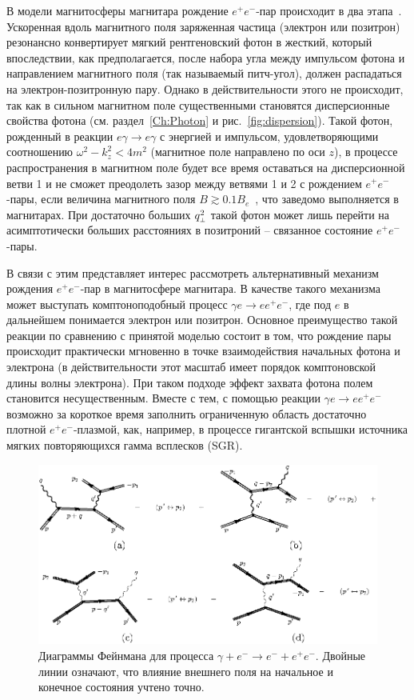 В модели магнитосферы магнитара рождение $e^+e^-$-пар происходит в два 
этапа~\cite{Beloborodov:2007}. Ускоренная вдоль магнитного поля 
заряженная частица (электрон или позитрон)  
резонансно конвертирует мягкий рентгеновский 
фотон в жесткий, который впоследствии, как предполагается, 
после набора угла между импульсом фотона и направлением 
магнитного поля (так называемый питч-угол), 
должен распадаться на электрон-позитронную пару.  Однако в действительности этого не происходит, так как 
в сильном магнитном поле существенными становятся 
дисперсионные свойства фотона (см. раздел~\ref{Ch:Photon}  и 
рис.~\ref{fig:dispersion}). Такой фотон, рожденный 
в реакции $e\gamma \to e \gamma$ с энергией и импульсом, удовлетворяющими соотношению 
$\omega^2-k_z^2 < 4m^2$ (магнитное поле направлено по оси $z$), в процессе 
распространения 
в магнитном поле будет все время оставаться на дисперсионной ветви 1 и не сможет преодолеть 
зазор между ветвями 1 и 2 с рождением $e^+e^-$-пары, если 
величина магнитного поля $B \gtrsim 0.1 B_e$~\cite{Shabad:1975,ShabUsov:1982,ShabUsov:1985}, 
что заведомо выполняется в магнитарах. 
При достаточно больших $q^2_{\mbox{\tiny $\bot$}}$ 
такой фотон может лишь перейти на асимптотически больших расстояниях 
в позитроний -- связанное состояние $e^+e^-$-пары. 



В связи с этим представляет интерес рассмотреть альтернативный механизм  рождения 
$e^+e^-$-пар в магнитосфере магнитара. В качестве такого механизма может выступать 
комптоноподобный процесс $\gamma e \to e e^+e^-$, где 
под $e$ в дальнейшем понимается электрон или позитрон. 
Основное преимущество такой реакции по сравнению с принятой 
моделью состоит в том, что рождение пары происходит практически мгновенно в точке взаимодействия 
начальных фотона и электрона 
(в действительности этот масштаб имеет порядок комптоновской длины волны электрона). При таком 
подходе эффект захвата фотона полем становится несущественным. 
Вместе с тем, с помощью 
реакции $\gamma e \to e e^+e^-$ возможно за короткое время заполнить 
ограниченную область 
 достаточно плотной 
$e^+e^-$-плазмой, как, например, 
в процессе гигантской вспышки источника мягких повторяющихся 
гамма всплесков (SGR).

%
\begin{figure}
\centerline{\includegraphics[width=17cm]{fig5_4.eps}}
\caption{Диаграммы Фейнмана для процесса $\gamma + e^{-} \to e^{-} + e^{+}e^{-}$. 
Двойные линии означают, что влияние внешнего поля на начальное и 
конечное состояния учтено точно.}
\label{fig:Diag}
\end{figure}

